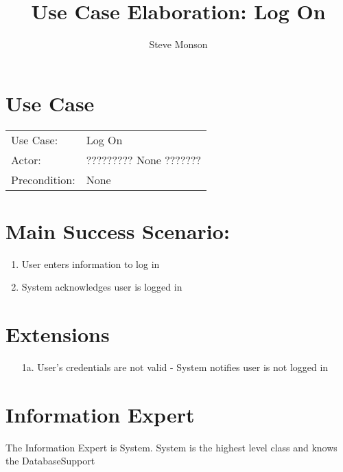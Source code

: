 \documentclass{article}
\title{Use Case Elaboration: Log On}
\author{ Steve Monson }
\begin{document}
\maketitle


\section*{Use Case}
\begin{tabular}{l l}
Use Case:     & Log On\\
Actor:        & ????????? None ???????\\
Precondition: & None\\
\end{tabular}


\section*{Main Success Scenario:}

\begin{enumerate}
    \item User enters information to log in
    \item System acknowledges user is logged in

\end{enumerate}

\section*{Extensions}

\begin{itemize}
    \item [1a.] User's credentials are not valid
                - System notifies user is not logged in
                            
\end{itemize}


\section*{Information Expert}

The Information Expert is System. System is the highest level class and knows the DatabaseSupport
\end{document}
